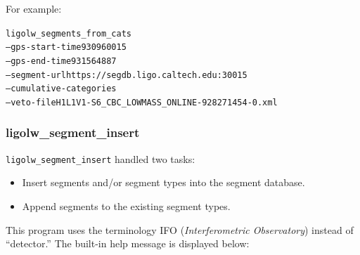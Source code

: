 For example:
\begin{alltt}
ligolw\_segments\_from\_cats
  --gps-start-time 930960015
  --gps-end-time 931564887
  --segment-url https://segdb.ligo.caltech.edu:30015
  --cumulative-categories
  --veto-file H1L1V1-S6\_CBC\_LOWMASS\_ONLINE-928271454-0.xml
\end{alltt}




\subsubsection{ligolw\_segment\_insert}

\texttt{ligolw\_segment\_insert} handled two tasks:
%
\begin{itemize}
\item Insert segments and/or segment types into the segment database.
\item Append segments to the existing segment types.
\end{itemize}
%
This program uses the terminology IFO (\emph{Interferometric Observatory})
instead of ``detector.''  The built-in help message is displayed below:
%

